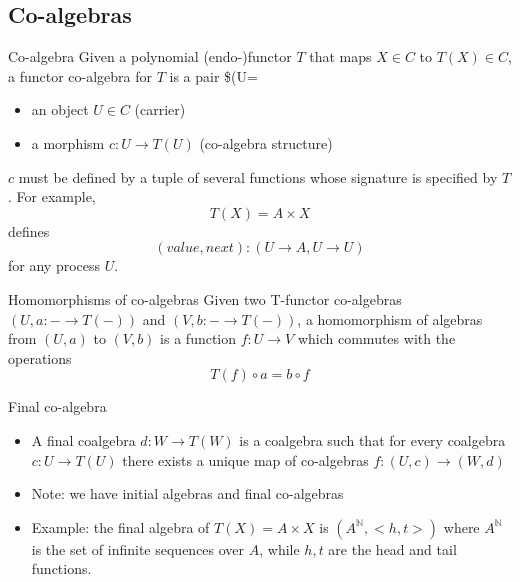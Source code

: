 \documentclass[presentation]{beamer}
\begin{document}
\subsection{Co-algebras}
\label{sec:org06428e0}
\begin{frame}[label={sec:org743665f}]{Co-algebra}
Given a polynomial (endo-)functor \(T\) that maps \(X \in C\) to \(T(X) \in
    C\), a functor co-algebra for \(T\) is a pair \$(U=

\begin{itemize}
\item an object \(U \in C\) (\alert{carrier})
\item a morphism \(c: U \rightarrow T(U)\) (\alert{co-algebra structure})
\end{itemize}

\(c\) must be defined by a tuple of several functions whose signature is
specified by \(T\). For example, $$T(X) = A \times X$$ defines $$(value,next):
    (U \rightarrow A, U \rightarrow U)$$ for any process \(U\).
\end{frame}
\begin{frame}[label={sec:orgb1de7b0}]{Homomorphisms of co-algebras}
Given two T-functor co-algebras \((U, a: - \rightarrow T(-))\) and \((V, b: - \rightarrow T(-))\),
a homomorphism of algebras from \((U,a)\) to \((V,b)\) is a function \(f: U \rightarrow V\) which commutes
with the operations $$ T(f) \circ a = b \circ f$$
\end{frame}
\begin{frame}[label={sec:orgf0ae614}]{Final co-algebra}
\begin{itemize}
\item A final coalgebra \(d: W \rightarrow T(W)\) is a coalgebra such that for
every coalgebra \(c: U \rightarrow T(U)\) there exists a unique map of
co-algebras \(f: (U,c) \rightarrow (W,d)\)

\item Note: we have \alert{initial algebras} and \alert{final} \alert{co-algebras}
\item Example: the final algebra of \(T(X) = A \times X\) is \((A^\mathbb{N}, <h,
      t>)\) where \(A^\mathbb{N}\) is the set of infinite sequences over \(A\), while
\(h,t\) are the \alert{head} and \alert{tail} functions.
\end{itemize}
\end{frame}
\end{document}
